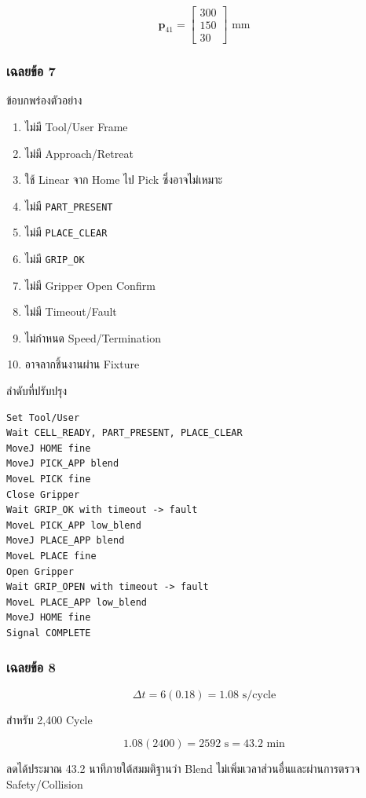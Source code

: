 \[
\mathbf{p}_{41}=
\begin{bmatrix}300\\150\\30\end{bmatrix}\text{ mm}
\]

\subsubsection{เฉลยข้อ 7}

ข้อบกพร่องตัวอย่าง

\begin{enumerate}
    \item ไม่มี Tool/User Frame
    \item ไม่มี Approach/Retreat
    \item ใช้ Linear จาก Home ไป Pick ซึ่งอาจไม่เหมาะ
    \item ไม่มี \texttt{PART\_PRESENT}
    \item ไม่มี \texttt{PLACE\_CLEAR}
    \item ไม่มี \texttt{GRIP\_OK}
    \item ไม่มี Gripper Open Confirm
    \item ไม่มี Timeout/Fault
    \item ไม่กำหนด Speed/Termination
    \item อาจลากชิ้นงานผ่าน Fixture
\end{enumerate}

ลำดับที่ปรับปรุง

\begin{verbatim}
Set Tool/User
Wait CELL_READY, PART_PRESENT, PLACE_CLEAR
MoveJ HOME fine
MoveJ PICK_APP blend
MoveL PICK fine
Close Gripper
Wait GRIP_OK with timeout -> fault
MoveL PICK_APP low_blend
MoveJ PLACE_APP blend
MoveL PLACE fine
Open Gripper
Wait GRIP_OPEN with timeout -> fault
MoveL PLACE_APP low_blend
MoveJ HOME fine
Signal COMPLETE
\end{verbatim}

\subsubsection{เฉลยข้อ 8}

\[
\Delta t=6(0.18)=1.08\text{ s/cycle}
\]

สำหรับ 2,400 Cycle

\[
1.08(2400)=2592\text{ s}=43.2\text{ min}
\]

ลดได้ประมาณ 43.2 นาทีภายใต้สมมติฐานว่า Blend ไม่เพิ่มเวลาส่วนอื่นและผ่านการตรวจ Safety/Collision

